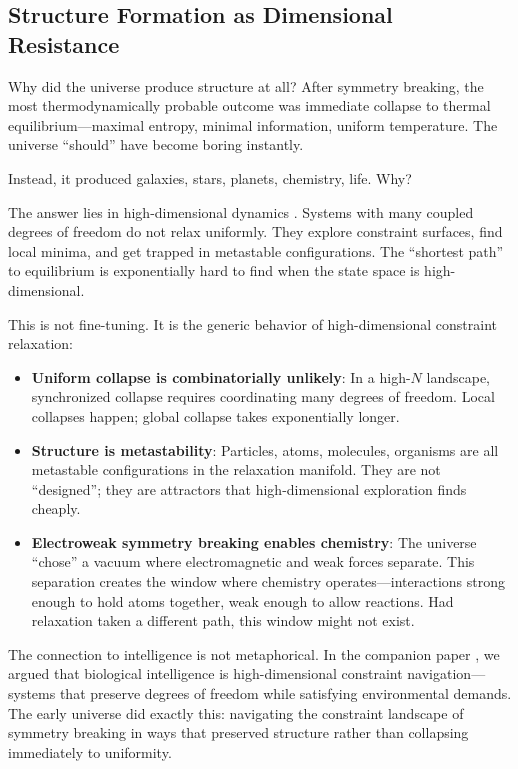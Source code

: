 \documentclass[11pt,a4paper]{article}
\begin{document}
\subsection{Structure Formation as Dimensional Resistance}

Why did the universe produce structure at all? After symmetry breaking, the most thermodynamically probable outcome was immediate collapse to thermal equilibrium---maximal entropy, minimal information, uniform temperature. The universe ``should'' have become boring instantly.

Instead, it produced galaxies, stars, planets, chemistry, life. Why?

The answer lies in high-dimensional dynamics \cite{todd2026intelligence}. Systems with many coupled degrees of freedom do not relax uniformly. They explore constraint surfaces, find local minima, and get trapped in metastable configurations. The ``shortest path'' to equilibrium is exponentially hard to find when the state space is high-dimensional.

This is not fine-tuning. It is the generic behavior of high-dimensional constraint relaxation:
\begin{itemize}
    \item \textbf{Uniform collapse is combinatorially unlikely}: In a high-$N$ landscape, synchronized collapse requires coordinating many degrees of freedom. Local collapses happen; global collapse takes exponentially longer.

    \item \textbf{Structure is metastability}: Particles, atoms, molecules, organisms are all metastable configurations in the relaxation manifold. They are not ``designed''; they are attractors that high-dimensional exploration finds cheaply.

    \item \textbf{Electroweak symmetry breaking enables chemistry}: The universe ``chose'' a vacuum where electromagnetic and weak forces separate. This separation creates the window where chemistry operates---interactions strong enough to hold atoms together, weak enough to allow reactions. Had relaxation taken a different path, this window might not exist.
\end{itemize}

The connection to intelligence is not metaphorical. In the companion paper \cite{todd2026intelligence}, we argued that biological intelligence is high-dimensional constraint navigation---systems that preserve degrees of freedom while satisfying environmental demands. The early universe did exactly this: navigating the constraint landscape of symmetry breaking in ways that preserved structure rather than collapsing immediately to uniformity.
\end{document}
